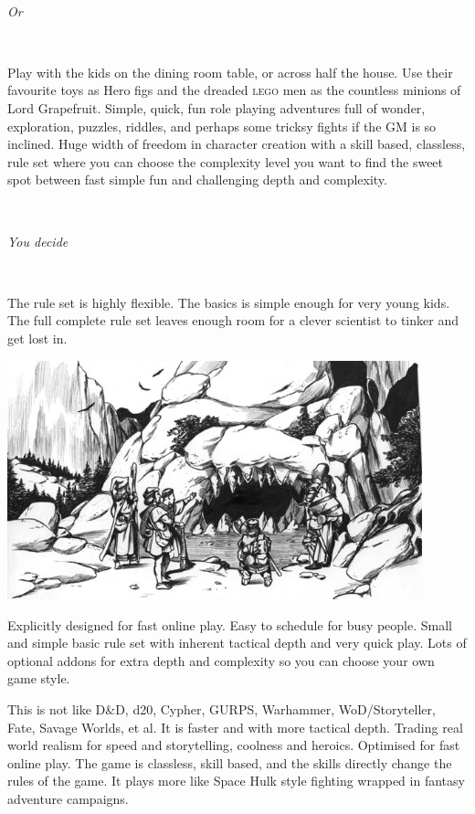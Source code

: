 \

\emph{Or}

\

\noindent
Play with the kids on the dining room table, or across half the house. Use their favourite toys as Hero figs and the dreaded \textsc{lego} men as the countless minions of Lord Grapefruit.
Simple, quick, fun role playing adventures full of wonder, exploration, puzzles, riddles, and perhaps some tricksy fights if the GM is so inclined.
Huge width of freedom in character creation with a skill based, classless, rule set where you can choose the complexity level you want to find the sweet spot between fast simple fun and challenging depth and complexity.

\

\emph{You decide}

\

\noindent
The rule set is highly flexible. The basics is simple enough for very young kids. The full complete rule set leaves enough room for a clever scientist to tinker and get lost in.




\vfill

\begin{center}
\includegraphics[width=120mm]{./fig/cavemouth.jpg}
\end{center}

\vfill




\noindent
Explicitly designed for fast online play. Easy to schedule for busy people. Small and simple basic rule set with inherent tactical depth and very quick play. Lots of optional addons for extra depth and complexity so you can choose your own game style.

This is not like D\&D, d20, Cypher, GURPS, Warhammer, WoD/Storyteller, Fate, Savage Worlds, et al. It is faster and with more tactical depth. Trading real world realism for speed and storytelling, coolness and heroics. Optimised for fast online play. The game is classless, skill based, and the skills directly change the rules of the game. It plays more like Space Hulk style fighting wrapped in fantasy adventure campaigns.







